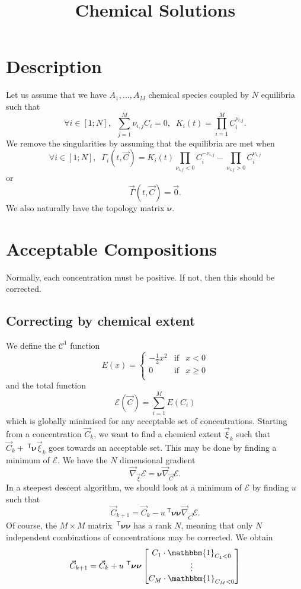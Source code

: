 \documentclass[aps]{revtex4}
\newcommand{\mymat}[1]{\bm{#1}}
\newcommand{\mytrn}[1]{~^{\mathsf{T}}{#1}}
\newcommand{\mygrad}{\vec{\nabla}}
\begin{document}
\title{Chemical Solutions}

\section{Description}
Let us assume that we have $A_1,\ldots,A_M$ chemical species coupled by
$N$ equilibria such that
\begin{equation}
	\forall i \in [1;N], \;\; \sum_{j=1}^{M} \nu_{i,j} C_i = 0, \;\; K_i(t) = \prod_{i=1}^{M} C_i^{\nu_{i,j}}.
\end{equation}
We remove the singularities by assuming that the equilibria are met when
\begin{equation}
	\forall i \in [1;N], \;\; \Gamma_i(t,\vec{C}) = K_i(t) \prod_{\nu_{i,j}<0}  C_i^{-\nu_{i,j}} -  \prod_{\nu_{i,j}>0} C_i^{\nu_{i,j}} 
\end{equation}
or
\begin{equation}
	\vec{\Gamma}(t,\vec{C}) = \vec{0}.
\end{equation}
We also naturally have the topology matrix $\mymat{\nu}$.

\section{Acceptable Compositions}
Normally, each concentration must be positive. If not, then this should be corrected.

\subsection{Correcting by chemical extent}
We define the $\mathcal{C}^1$ function
$$
	E(x) = \left\lbrace
	\begin{array}{rcl}
	-\frac{1}{2} x^2 & \text{if} & x<0\\
	0                & \text{if} & x\geq0\\
	\end{array}
	\right.
$$
and the total function
$$
	\mathcal{E}(\vec{C}) = \sum_{i=1}^M E(C_i)
$$
which is globally minimised for any acceptable set of concentrations.
Starting from a concentration $\vec{C}_k$, we want to find a chemical extent $\vec{\xi}_k$ such that
$\vec{C}_k + \mytrn{\mymat{\nu}}\vec{\xi}_k$ goes towards an acceptable set.
This may be done by finding a minimum of $\mathcal{E}$.
We have the $N$ dimensional gradient
$$
	\mygrad_{\vec{\xi}} \mathcal{E} = \mymat{\nu} \mygrad_{\vec{C}} \mathcal{E}.
$$
In a steepest descent algorithm, we should look at a minimum of $\mathcal{E}$
by finding $u$ such that
$$
	\vec{C}_{k+1} = \vec{C}_{k} - u \mytrn{\mymat{\nu}} \mymat{\nu} \mygrad_{\vec{C}} \mathcal{E}.
$$
Of course, the $M\times M$ matrix $\mytrn{\mymat{\nu}} \mymat{\nu}$ has a rank $N$, meaning that
only $N$ independent combinations of concentrations may be corrected.
We obtain
$$
	\vec{C}_{k+1} = \vec{C}_{k} + u \mytrn{\mymat{\nu}} \mymat{\nu}
	\begin{bmatrix}
	C_1 \cdot \mathbbm{1}_{C_1<0}\\
	\vdots\\
	C_M \cdot \mathbbm{1}_{C_M<0}\\
	\end{bmatrix} 
$$
\end{document}
